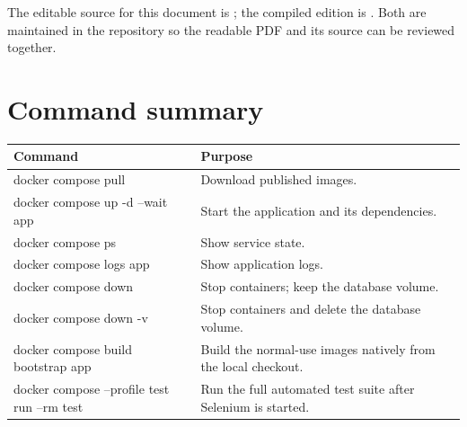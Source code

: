 \documentclass[11pt,a4paper]{article}
\begin{document}
The editable source for this document is ; the
compiled edition is . Both are maintained in the
repository so the readable PDF and its source can be reviewed together.

\appendix
\section{Command summary}

\begin{tabularx}{\textwidth}{@{}>{\raggedright\arraybackslash\ttfamily}p{69mm}X@{}}
\toprule
\normalfont\bfseries Command & \textbf{Purpose} \\
\midrule
docker compose pull & Download published images. \\
docker compose up -d --wait app & Start the application and its dependencies. \\
docker compose ps & Show service state. \\
docker compose logs app & Show application logs. \\
docker compose down & Stop containers; keep the database volume. \\
docker compose down -v & Stop containers and delete the database volume. \\
docker compose build bootstrap app & Build the normal-use images natively from the local checkout. \\
docker compose --profile test run --rm test & Run the full automated test suite after Selenium is started. \\
\bottomrule
\end{tabularx}
\end{document}

